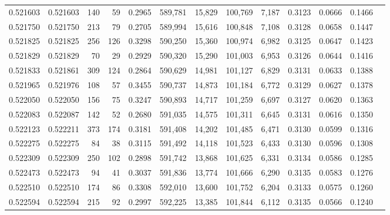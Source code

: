 \begin{tabular}{rrrrrrrrrrrrr}
0.521603 & 0.521603 &   140 &    59 &                                     0.2965 & 589,781 &  15,829 & 100,769 &   7,187 & 0.3123 & 0.0666 & 0.1466 \\
0.521750 & 0.521750 &   213 &    79 &                                     0.2705 & 589,994 &  15,616 & 100,848 &   7,108 & 0.3128 & 0.0658 & 0.1447 \\
0.521825 & 0.521825 &   256 &   126 &                                     0.3298 & 590,250 &  15,360 & 100,974 &   6,982 & 0.3125 & 0.0647 & 0.1423 \\
0.521829 & 0.521829 &    70 &    29 &                                     0.2929 & 590,320 &  15,290 & 101,003 &   6,953 & 0.3126 & 0.0644 & 0.1416 \\
0.521833 & 0.521861 &   309 &   124 &                                     0.2864 & 590,629 &  14,981 & 101,127 &   6,829 & 0.3131 & 0.0633 & 0.1388 \\
0.521965 & 0.521976 &   108 &    57 &                                     0.3455 & 590,737 &  14,873 & 101,184 &   6,772 & 0.3129 & 0.0627 & 0.1378 \\
0.522050 & 0.522050 &   156 &    75 &                                     0.3247 & 590,893 &  14,717 & 101,259 &   6,697 & 0.3127 & 0.0620 & 0.1363 \\
0.522083 & 0.522087 &   142 &    52 &                                     0.2680 & 591,035 &  14,575 & 101,311 &   6,645 & 0.3131 & 0.0616 & 0.1350 \\
0.522123 & 0.522211 &   373 &   174 &                                     0.3181 & 591,408 &  14,202 & 101,485 &   6,471 & 0.3130 & 0.0599 & 0.1316 \\
0.522275 & 0.522275 &    84 &    38 &                                     0.3115 & 591,492 &  14,118 & 101,523 &   6,433 & 0.3130 & 0.0596 & 0.1308 \\
0.522309 & 0.522309 &   250 &   102 &                                     0.2898 & 591,742 &  13,868 & 101,625 &   6,331 & 0.3134 & 0.0586 & 0.1285 \\
0.522473 & 0.522473 &    94 &    41 &                                     0.3037 & 591,836 &  13,774 & 101,666 &   6,290 & 0.3135 & 0.0583 & 0.1276 \\
0.522510 & 0.522510 &   174 &    86 &                                     0.3308 & 592,010 &  13,600 & 101,752 &   6,204 & 0.3133 & 0.0575 & 0.1260 \\
0.522594 & 0.522594 &   215 &    92 &                                     0.2997 & 592,225 &  13,385 & 101,844 &   6,112 & 0.3135 & 0.0566 & 0.1240 \\

\end{tabular}
